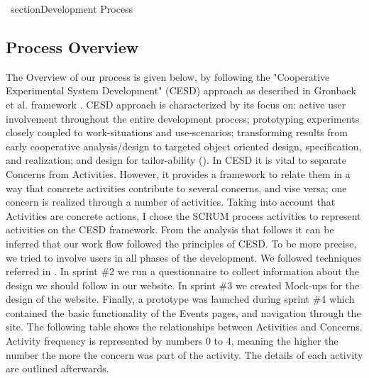 \	section{Development Process}

\subsection{Process Overview}

The Overview of our process is given below, by following the "Cooperative Experimental System Development" (CESD) approach as described in Gronbaek et al. framework \cite{CESD}.
CESD approach is characterized by its focus on: active user involvement throughout the entire development process; prototyping experiments closely coupled to work-situations and use-scenarios; transforming results from early cooperative analysis/design to targeted object oriented design, specification, and realization; and design for tailor-ability (\cite{CESD}). In CESD it is vital to separate Concerns from Activities. However, it provides a framework to relate them in a way that concrete activities contribute to several concerns, and vise versa; one concern is realized through a number of activities. 
Taking into account that Activities are concrete actions, I chose the SCRUM process activities to represent activities on the CESD framework. From the analysis that follows it can be inferred that our work flow followed the principles of CESD. To be more precise, we tried to involve users in all phases of the development. We followed techniques referred in \cite{CESD}. In sprint \#2 we run a questionnaire to collect information about the design we should follow in our website. In sprint \#3 we created Mock-ups for the design of the website. Finally, a prototype was launched during sprint \#4 which contained the basic functionality of the Events pages, and navigation through the site. The following table shows the relationships between Activities and Concerns. Activity frequency is represented by numbers 0 to 4, meaning the higher the number the more the concern was part of the activity. The details of each activity are outlined afterwards.

